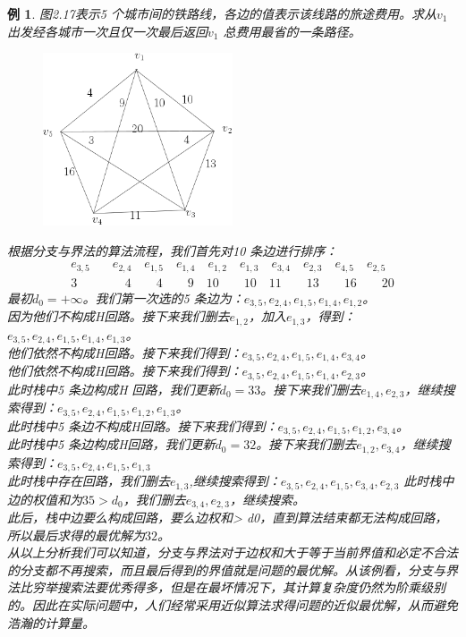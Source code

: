 \documentclass[11pt,a4paper,openany]{book}
\newtheorem{sample}{\textbf{例}}[section]
\begin{document}
\begin{sample}
图2.17表示5 个城市间的铁路线，各边的值表示该线路的旅途费用。求从$v_1$出发经各城市一次且仅一次最后返回$v_1$ 总费用最省的一条路径。\\
\begin{figure}[H]
  \centering
  \includegraphics[width=0.5\textwidth]{2.17.png}
  \caption{}
\end{figure}
\noindent 根据分支与界法的算法流程，我们首先对10 条边进行排序：\\
\begin{align*}
  e_{3,5}&\quad e_{2,4} \quad e_{1,5} \quad e_{1,4} \quad e_{1,2} \quad e_{1,3}\quad e_{3,4}\quad e_{2,3}\quad  e_{4,5}\quad e_{2,5}\\
  3 &\qquad 4 \quad \quad 4 \qquad 9\quad 10\qquad 10\quad 11\qquad 13\qquad 16\qquad 20
\end{align*}
\indent 最初$d_0 = +\infty$。我们第一次选的5 条边为：$e_{3,5},e_{2,4},e_{1,5},e_{1,4},e_{1,2}$。\\
\indent 因为他们不构成H回路。接下来我们删去$e_{1,2}$，加入$e_{1,3}$，得到：$e_{3,5},e_{2,4},e_{1,5},e_{1,4},e_{1,3}$。\\
\indent 他们依然不构成H回路。接下来我们得到：$e_{3,5},e_{2,4},e_{1,5},e_{1,4},e_{3,4}$。\\
\indent 他们依然不构成H回路。接下来我们得到：$e_{3,5},e_{2,4},e_{1,5},e_{1,4},e_{2,3}$。\\
\indent 此时栈中5 条边构成H 回路，我们更新$d_0 = 33$。接下来我们删去$e_{1,4},e_{2,3}$，继续搜索得到：$e_{3,5},e_{2,4},e_{1,5},e_{1,2},e_{1,3}$。\\
\indent 此时栈中5 条边不构成H回路。接下来我们得到：$e_{3,5},e_{2,4},e_{1,5},e_{1,2},e_{3,4}$。\\
\indent 此时栈中5 条边构成H回路，我们更新$d_0 = 32$。接下来我们删去$e_{1,2},e_{3,4}$，继续搜索得到：$e_{3,5},e_{2,4},e_{1,5},e_{1,3}$\\
\indent 此时栈中存在回路，我们删去$e_{1,3}$,继续搜索得到：$e_{3,5},e_{2,4},e_{1,5},e_{3,4},e_{2,3}$ 此时栈中边的权值和为$35>d_0$，我们删去$e_{3,4},e_{2,3}$，继续搜索。\\
\indent 此后，栈中边要么构成回路，要么边权和> d0，直到算法结束都无法构成回路，所以最后求得的最优解为$32$。\\
\indent 从以上分析我们可以知道，分支与界法对于边权和大于等于当前界值和必定不合法的分支都不再搜索，而且最后得到的界值就是问题的最优解。从该例看，分支与界法比穷举搜索法要优秀得多，但是在最坏情况下，其计算复杂度仍然为阶乘级别的。因此在实际问题中，人们经常采用近似算法求得问题的近似最优解，从而避免浩瀚的计算量。\\
\end{sample}
\end{document}

